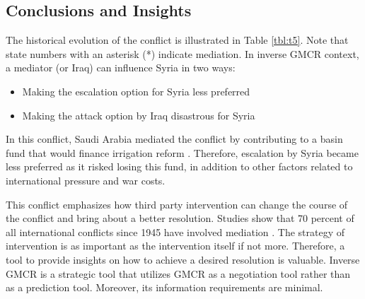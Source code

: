 \documentclass[letterpaper,12pt,titlepage,oneside,final]{book}
\begin{document}
%


\subsection{Conclusions and Insights}
The historical evolution of the conflict is illustrated in Table \ref{tbl:t5}. Note that state numbers with an asterisk (*) indicate mediation. In inverse GMCR context, a mediator (or Iraq) can influence Syria in two ways:
\begin{itemize}
\item Making the escalation option for Syria less preferred 
\item Making the attack option by Iraq disastrous for Syria
\end{itemize}

In this conflict, Saudi Arabia mediated the conflict by contributing to a basin fund that would finance irrigation reform \cite{akanda2007tigris}. Therefore, escalation by Syria became less preferred as it risked losing this fund, in addition to other factors related to international pressure and war costs.

This conflict emphasizes how third party intervention can change the course of the conflict and bring about a better resolution.  Studies show that 70 percent of all international conflicts since 1945 have involved mediation \cite{bercovitch2006}. The strategy of intervention is as important as the intervention itself if not more. Therefore, a tool to provide insights on how to achieve a desired resolution is valuable. Inverse GMCR is a strategic tool that utilizes GMCR as a negotiation tool rather than as a prediction tool. Moreover, its information requirements are minimal.
\end{document}

